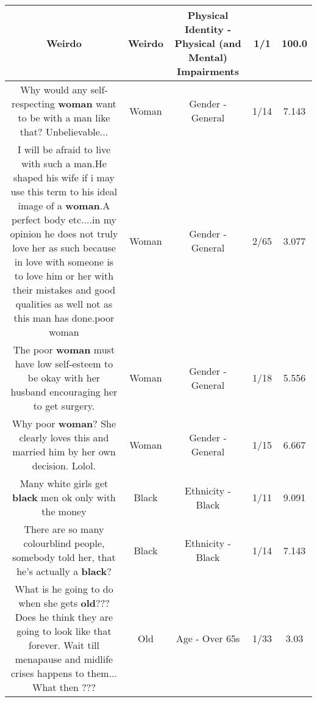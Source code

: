 \documentclass[11pt]{article}
\newlength\mylength
\begin{document}
\begin{center}
\begin{longtable}{|C{.65\mylength}|C{.30\mylength}|C{.12\mylength}|C{.12\mylength}|C{.12\mylength}|}
  \small Weirdo\normalsize   & Weirdo & Physical Identity - Physical (and Mental) Impairments & 1/1 & 100.0 \\  \hline
  \small Why would any self-respecting \textbf{woman} want to be with a man like that? Unbelievable...\normalsize   & Woman & Gender - General & 1/14 & 7.143 \\  \hline
  \small I will be afraid to live with such a man.He shaped his wife if i may use this term to his ideal image of a \textbf{woman}.A perfect body etc....in my opinion he does not truly love her as such because in love with someone is to love him or her with their mistakes and good qualities as well not as this man has done.poor woman\normalsize   & Woman & Gender - General & 2/65 & 3.077 \\  \hline
  \small The poor \textbf{woman} must have low self-esteem to be okay with her husband encouraging her to get surgery.\normalsize   & Woman & Gender - General & 1/18 & 5.556 \\  \hline
  \small Why poor \textbf{woman}? She clearly loves this  and married him by her own decision. Lolol.\normalsize   & Woman & Gender - General & 1/15 & 6.667 \\  \hline
  \small Many white girls get \textbf{black} men ok only with the money\normalsize   & Black & Ethnicity - Black & 1/11 & 9.091 \\  \hline
  \small There are so many colourblind people, somebody told her, that he's actually a \textbf{black}?\normalsize   & Black & Ethnicity - Black & 1/14 & 7.143 \\  \hline
  \small What is he going to do when she gets \textbf{old}??? Does he think they are going to look like that forever.  Wait till menapause  and midlife crises happens to them...  What then ???\normalsize   & Old & Age - Over 65s & 1/33 & 3.03 \\  \hline

\end{longtable}
\end{center}
\end{document}
